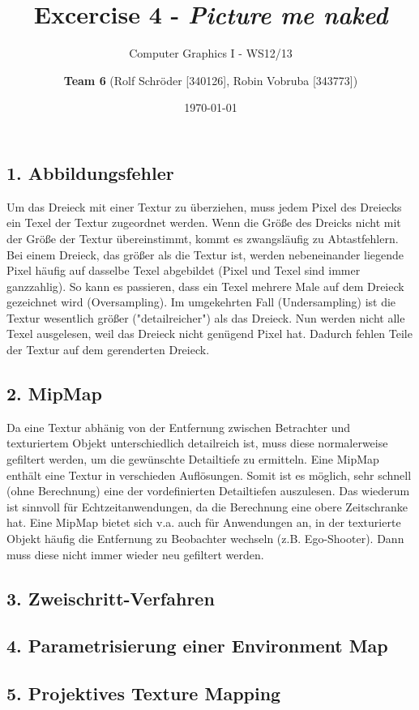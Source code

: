 \documentclass[a4paper,headings=small]{scrartcl}
\title{Excercise 4 - \emph{Picture me naked}}
\subtitle{Computer Graphics I - WS12/13}
\author{\textbf{Team 6} (Rolf Schröder [340126], Robin Vobruba [343773])}
\date{\today}
\numberwithin{equation}{section} %
\numberwithin{figure}{section}   %
\begin{document}
\maketitle

\subsection*{1. Abbildungsfehler}
Um das Dreieck mit einer Textur zu überziehen, muss jedem Pixel des Dreiecks ein Texel der Textur zugeordnet werden.
Wenn die Größe des Dreicks nicht mit der Größe der Textur übereinstimmt, kommt es zwangsläufig zu Abtastfehlern.
Bei einem Dreieck, das größer als die Textur ist, werden nebeneinander liegende Pixel häufig auf dasselbe Texel abgebildet (Pixel und Texel sind immer ganzzahlig).
So kann es passieren, dass ein Texel mehrere Male auf dem Dreieck gezeichnet wird (Oversampling).
Im umgekehrten Fall (Undersampling) ist die Textur wesentlich größer ("detailreicher") als das Dreieck.
Nun werden nicht alle Texel ausgelesen, weil das Dreieck nicht genügend Pixel hat.
Dadurch fehlen Teile der Textur auf dem gerenderten Dreieck.

\subsection*{2. MipMap}
Da eine Textur abhänig von der Entfernung zwischen Betrachter und texturiertem Objekt unterschiedlich detailreich ist, muss diese normalerweise gefiltert werden, um die gewünschte Detailtiefe zu ermitteln.
Eine MipMap enthält eine Textur in verschieden Auflösungen.
Somit ist es möglich, sehr schnell (ohne Berechnung) eine der vordefinierten Detailtiefen auszulesen.
Das wiederum ist sinnvoll für Echtzeitanwendungen, da die Berechnung eine obere Zeitschranke hat.
Eine MipMap bietet sich v.a. auch für Anwendungen an, in der texturierte Objekt häufig die Entfernung zu Beobachter wechseln (z.B. Ego-Shooter).
Dann muss diese nicht immer wieder neu gefiltert werden.

\subsection*{3. Zweischritt-Verfahren}

\subsection*{4. Parametrisierung einer Environment Map}

\subsection*{5. Projektives Texture Mapping}
\end{document}
